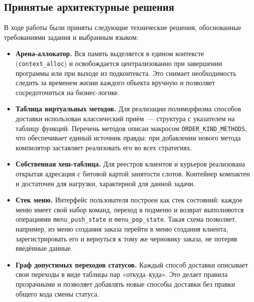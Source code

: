 \documentclass[12pt]{extarticle}
\newcommand{\cmd}[1]{\texttt{#1}}
\begin{document}
\subsection*{Принятые архитектурные решения}

В ходе работы были приняты следующие технические решения,
обоснованные требованиями задания и выбранным языком:

\begin{itemize}
    \item \textbf{Арена-аллокатор.} Вся память выделяется в едином
          контексте (\cmd{context\_alloc}) и освобождается
          централизованно при завершении программы или при выходе
          из подконтекста. Это снимает необходимость следить за
          временем жизни каждого объекта вручную и позволяет
          сосредоточиться на бизнес-логике.

    \item \textbf{Таблица виртуальных методов.} Для реализации
          полиморфизма способов доставки использован классический
          приём~--- структура с указателем на таблицу функций.
          Перечень методов описан макросом
          \cmd{ORDER\_KIND\_METHODS}, что обеспечивает единый
          источник правды: при добавлении нового метода компилятор
          заставляет реализовать его во всех стратегиях.

    \item \textbf{Собственная хеш-таблица.} Для реестров клиентов
          и курьеров реализована открытая адресация с битовой
          картой занятости слотов. Контейнер компактен и достаточен
          для нагрузки, характерной для данной задачи.

    \item \textbf{Стек меню.} Интерфейс пользователя построен как
          стек состояний: каждое меню имеет свой набор команд,
          переход в подменю и возврат выполняются операциями
          \cmd{menu\_push\_state} и \cmd{menu\_pop\_state}. Такая
          схема позволяет, например, из меню создания заказа
          перейти в меню создания клиента, зарегистрировать его и
          вернуться к тому же черновику заказа, не потеряв
          введённые данные.

    \item \textbf{Граф допустимых переходов статусов.} Каждый
          способ доставки описывает свои переходы в виде таблицы
          пар «откуда--куда». Это делает правила прозрачными и
          позволяет добавлять новые способы доставки без правки
          общего кода смены статуса.
\end{itemize}
\end{document}
